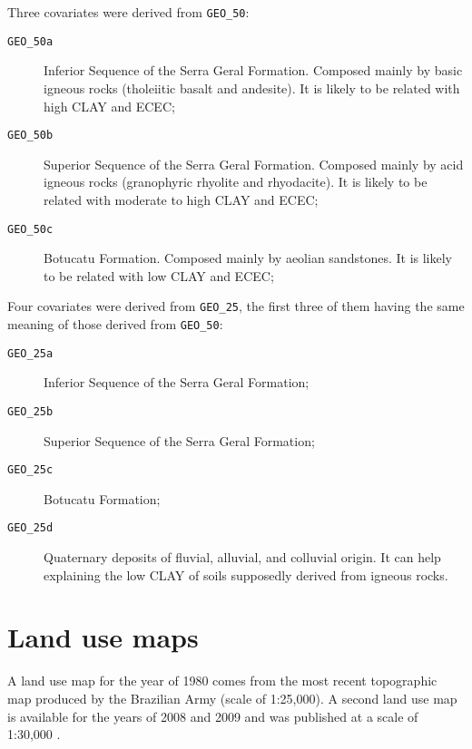 Three covariates were derived from \texttt{GEO\_50}:

\begin{description}
 \item[\texttt{GEO\_50a}] Inferior Sequence of the Serra Geral Formation. Composed mainly by basic 
 igneous rocks (tholeiitic basalt and andesite). It is likely to be related with high CLAY and 
 ECEC;
 
 \item[\texttt{GEO\_50b}] Superior Sequence of the Serra Geral Formation. Composed mainly by acid 
 igneous rocks (granophyric rhyolite and rhyodacite). It is likely to be related with moderate to 
 high CLAY and ECEC;
 
 \item[\texttt{GEO\_50c}] Botucatu Formation. Composed mainly by aeolian sandstones. It is likely 
 to be related with low CLAY and ECEC;
\end{description}

Four covariates were derived from \texttt{GEO\_25}, the first three of them having the same meaning 
of those derived from \texttt{GEO\_50}:

\begin{description}
 \item[\texttt{GEO\_25a}] Inferior Sequence of the Serra Geral Formation;
 
 \item[\texttt{GEO\_25b}] Superior Sequence of the Serra Geral Formation;
 
 \item[\texttt{GEO\_25c}] Botucatu Formation;
 
 \item[\texttt{GEO\_25d}] Quaternary deposits of fluvial, alluvial, and colluvial 
 origin. It can help explaining the low CLAY of soils supposedly derived from igneous rocks.
\end{description}

\tocless\section{Land use maps}
\label{sec:covar-data-land-use}

A land use map for the year of 1980 comes from the most recent topographic map produced by the Brazilian Army (scale of 1:25,000). A second land use map is available for the years of 2008 and 2009 and was published at a scale of 1:30,000 \cite{SamuelRosaEtAl2011a}.

